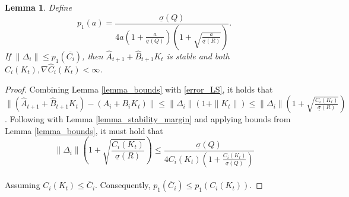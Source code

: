 \documentclass[letterpaper, 10 pt, conference]{ieeeconf}  %
\newtheorem{lemma}{Lemma}
\begin{document}
\begin{lemma}
\label{lemma_stability}
Define
\[
p_1(a) = \frac{\underline{\sigma}(Q)}{4a\!\left(1 + \frac{a}{\underline{\sigma}(Q)}\right)\!\left(1 + \sqrt{\frac{a}{\underline{\sigma}(R)}}\right)}.
\]
If \(\|\Delta_i\| \le p_1(\overline{C_i})\), then \(\hat{A}_{t+1} + \hat{B}_{t+1}K_t\) is stable and both $\hat{C}_i(K_t), \nabla \hat{C}_i(K_t)< \infty$.
\end{lemma} \vspace{2mm}
\begin{proof}
Combining Lemma \ref{lemma_bounds} with \ref{error_LS}, it holds that
$\|(\hat{A}_{t+1} + \hat{B}_{t+1}K_t) - (A_i + B_iK_t)\| \leq \|\Delta_i\| (1 + \|K_t\|) \leq \|\Delta_i\|\left(1 + \sqrt{\frac{C_i(K_t)}{\underline{\sigma}(R)}}\right)$. 
Following with Lemma \ref{lemma_stability_margin} and applying bounds from Lemma \ref{lemma_bounds}, it must hold that
\begin{equation}
    \|\Delta_i\|(1 + \sqrt{\frac{C_i(K_t)}{\underline{\sigma}(R)}}) \leq \frac{\underline{\sigma}(Q)}{4C_i(K_t)(1 + \frac{C_i(K_t)}{\underline{\sigma}(Q)})}
\end{equation} \\
Assuming $C_i(K_t) \leq \overline{C}_i$. Consequently, $p_1(\overline{C}_i) \leq p_1(C_i(K_t))$.
\end{proof} 
\end{document}
